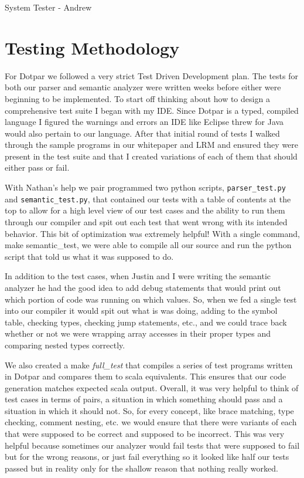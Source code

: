 System Tester - Andrew

\section{Testing Methodology}
For Dotpar we followed a very strict Test Driven Development plan. The
tests for both our parser and semantic analyzer were written weeks
before either were beginning to be implemented. To start off thinking
about how to design a comprehensive test suite I began with my
IDE. Since Dotpar is a typed, compiled language I figured the warnings
and errors an IDE like Eclipse threw for Java would also pertain to
our language. After that initial round of tests I walked through the
sample programs in our whitepaper and LRM and ensured they were
present in the test suite and that I created variations of each of
them that should either pass or fail.

With Nathan's help we pair programmed two python scripts,
\verb=parser_test.py= and \verb=semantic_test.py=, that contained our
tests with a table of contents at the top to allow for a high level
view of our test cases and the ability to run them through our
compiler and spit out each test that went wrong with its intended
behavior. This bit of optimization was extremely helpful! With a
single command, make semantic\_test, we were able to compile all our
source and run the python script that told us what it was supposed to
do.

In addition to the test cases, when Justin and I were writing the
semantic analyzer he had the good idea to add debug statements that
would print out which portion of code was running on which values. So,
when we fed a single test into our compiler it would spit out what is
was doing, adding to the symbol table, checking types, checking jump
statements, etc., and we could trace back whether or not we were
wrapping array accesses in their proper types and comparing nested
types correctly.

We also created a make \emph{full\_test} that compiles a series of
test programs written in Dotpar and compares them to scala
equivalents. This ensures that our code generation matches expected
scala output.  Overall, it was very helpful to think of test cases in
terms of pairs, a situation in which something should pass and a
situation in which it should not. So, for every concept, like brace
matching, type checking, comment nesting, etc. we would ensure that
there were variants of each that were supposed to be correct and
supposed to be incorrect. This was very helpful because sometimes our
analyzer would fail tests that were supposed to fail but for the wrong
reasons, or just fail everything so it looked like half our tests
passed but in reality only for the shallow reason that nothing really
worked.

